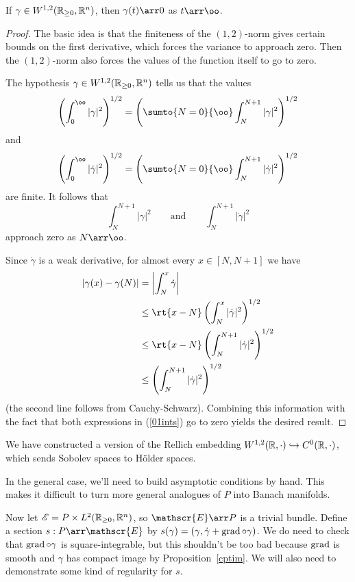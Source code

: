 \begin{prop} \label{cptim}
  If $\gamma \in W^{1,2}(\mathbb{R}_{\geq 0},\mathbb{R}^n)$, then $\gamma(t) \arr 0$ as $t \arr \oo$.
\end{prop}
\begin{proof}
The basic idea is that the finiteness of the $(1,2)$-norm gives certain bounds on the first derivative, which forces the variance to approach zero. Then the $(1,2)$-norm also forces the values of the function itself to go to zero.

The hypothesis $\gamma \in W^{1,2}(\mathbb{R}_{\geq 0},\mathbb{R}^n)$ tells us that the values
\[
\left( \displaystyle\int_0^\oo |\gamma|^2 \right)^{1/2} = \left( \sumto{N=0}{\oo} \displaystyle\int_N^{N+1} |\gamma|^2 \right)^{1/2}
\]
and
\[
\left( \displaystyle\int_0^\oo |\dot{\gamma}|^2 \right)^{1/2} = \left( \sumto{N=0}{\oo} \displaystyle\int_N^{N+1} |\dot{\gamma}|^2 \right)^{1/2}
\]
are finite. It follows that 
\[
\displaystyle\int_N^{N+1} |\gamma|^2 \qquad \text{and} \qquad \displaystyle\int_N^{N+1} |\dot{\gamma}|^2 \tag{$\dagger$} \label{01ints}
\]
approach zero as $N \arr \oo$.

Since $\dot{\gamma}$ is a weak derivative, for almost every $x \in [N,N+1]$ we have
\begin{align*}
|\gamma(x)-\gamma(N)| & = \left| \displaystyle\int_N^x \dot{\gamma} \right|
\\
& \leq \rt{x-N} \left( \displaystyle\int_N^x |\dot{\gamma}|^2 \right)^{1/2}
\\
& \leq \rt{x-N} \left( \displaystyle\int_N^{N+1} |\dot{\gamma}|^2 \right)^{1/2}
\\
& \leq \left( \displaystyle\int_N^{N+1} |\dot{\gamma}|^2 \right)^{1/2}
\end{align*}
(the second line follows from Cauchy-Schwarz). Combining this information with the fact that both expressions in (\ref{01ints}) go to zero yields the desired result.
\end{proof}
\begin{remark}
We have constructed a version of the Rellich embedding $W^{1,2}(\mathbb{R},\cdot) \hookrightarrow C^0(\mathbb{R},\cdot)$, which sends Sobolev spaces to H\"{o}lder spaces.
\end{remark}

\begin{remark}
In the general case, we'll need to build asymptotic conditions by hand. This makes it difficult to turn more general analogues of $P$ into Banach manifolds.
\end{remark}

Now let $\mathscr{E}=P \times L^2(\mathbb{R}_{\geq 0},\mathbb{R}^n)$, so $\mathscr{E} \arr P$ is a trivial bundle. Define a section $s:P \arr \mathscr{E}$ by $s(\gamma)=(\gamma, \dot{\gamma}+\operatorname{grad} \circ \gamma)$. We do need to check that $\operatorname{grad} \circ \gamma$ is square-integrable, but this shouldn't be too bad because $\operatorname{grad}$ is smooth and $\gamma$ has compact image by Proposition~\ref{cptim}. We will also need to demonstrate some kind of regularity for $s$.

